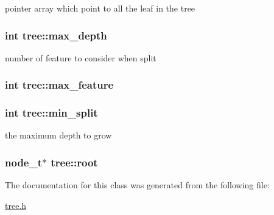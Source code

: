 pointer array which point to all the leaf in the tree \hypertarget{classtree_a0a9f968fac827d3239be67488c34fb21}{
\subsubsection[{max\+\_\+depth}]{\setlength{\rightskip}{0pt plus 5cm}int tree\+::max\+\_\+depth\hspace{0.3cm}{\ttfamily [protected]}}}\label{classtree_a0a9f968fac827d3239be67488c34fb21}
number of feature to consider when split \hypertarget{classtree_a6f4304318f8f091f7d783ac1ec7d2775}{
\subsubsection[{max\+\_\+feature}]{\setlength{\rightskip}{0pt plus 5cm}int tree\+::max\+\_\+feature\hspace{0.3cm}{\ttfamily [protected]}}}\label{classtree_a6f4304318f8f091f7d783ac1ec7d2775}
\hypertarget{classtree_ae70cd626c0b50a0b8306a94a9e5e8fd7}{
\subsubsection[{min\+\_\+split}]{\setlength{\rightskip}{0pt plus 5cm}int tree\+::min\+\_\+split\hspace{0.3cm}{\ttfamily [protected]}}}\label{classtree_ae70cd626c0b50a0b8306a94a9e5e8fd7}
the maximum depth to grow \hypertarget{classtree_a1c9d515ea8291ba3e8dd27a32ad11c99}{
\subsubsection[{root}]{\setlength{\rightskip}{0pt plus 5cm}node\+\_\+t$\ast$ tree\+::root\hspace{0.3cm}{\ttfamily [protected]}}}\label{classtree_a1c9d515ea8291ba3e8dd27a32ad11c99}


The documentation for this class was generated from the following file\+:\begin{DoxyCompactItemize}
\item 
\hyperlink{tree_8h}{tree.\+h}\end{DoxyCompactItemize}
